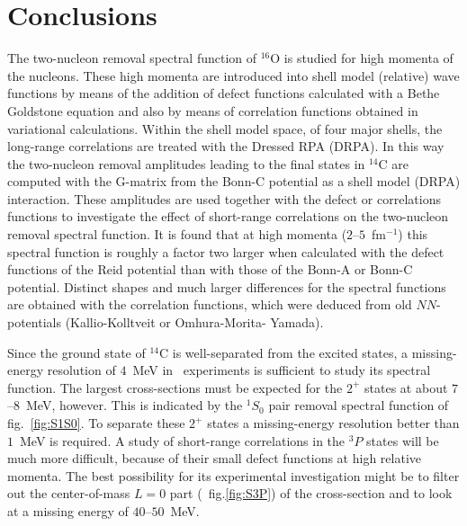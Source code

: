 \section{Conclusions\label{sec:PPconclusions}}
The two-nucleon removal spectral function of $^{16}$O is studied for high 
momenta of the nucleons. These high momenta are introduced into shell model 
(relative) wave functions by means of the addition of defect functions 
calculated with a Bethe Goldstone equation\cite{MS93a} and also by means of 
correlation functions obtained in variational calculations\cite{Cl81}. Within 
the shell model space, of four major shells, the long-range correlations are 
treated with the Dressed RPA (DRPA). In this way
the two-nucleon removal amplitudes 
leading to the final states in $^{14}$C are computed with the G-matrix from 
the Bonn-C potential as a shell model (DRPA) interaction.
These amplitudes are used together with the defect or correlations functions 
to investigate the effect of short-range correlations on the two-nucleon 
removal spectral function. It is found that at high momenta
($2$--$5$~fm$^{-1}$) this spectral function is roughly a factor two larger 
when calculated
with the defect functions of the Reid potential than with those of the Bonn-A 
or Bonn-C potential. Distinct shapes and much larger differences for the 
spectral functions are obtained with the correlation functions, which were 
deduced\cite{Cl81} from old $NN$-potentials (Kallio-Kolltveit or Omhura-Morita-
Yamada).

Since the ground state of $^{14}$C is well-separated from the excited states, 
a missing-energy resolution of $4$~MeV in \eepp\ experiments is sufficient to 
study its spectral function. The largest cross-sections must be expected for 
the $2^+$ states at about $7$--$8$~MeV, however. This is indicated by the 
$^1S_0$ pair removal spectral function of fig.~\ref{fig:S1S0}. To separate 
these $2^+$ states a missing-energy resolution better than $1$~MeV is required. 
A study of short-range correlations in the $^3P$ states will be much more 
difficult, because of their small defect functions at high relative momenta. 
The best possibility for its experimental investigation might be to filter out 
the center-of-mass $L=0$ part (\cf\ fig.\ref{fig:S3P}) of the cross-section 
and to look at a missing energy of $40$--$50$~MeV.
